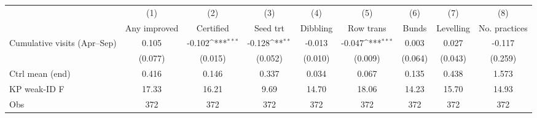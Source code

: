 {
\def\sym#1{\ifmmode^{#1}\else\(^{#1}\)\fi}
\begin{tabular}{l*{8}{c}}
\toprule
                    &\multicolumn{1}{c}{(1)}&\multicolumn{1}{c}{(2)}&\multicolumn{1}{c}{(3)}&\multicolumn{1}{c}{(4)}&\multicolumn{1}{c}{(5)}&\multicolumn{1}{c}{(6)}&\multicolumn{1}{c}{(7)}&\multicolumn{1}{c}{(8)}\\
                    &\multicolumn{1}{c}{Any improved}&\multicolumn{1}{c}{Certified}&\multicolumn{1}{c}{Seed trt}&\multicolumn{1}{c}{Dibbling}&\multicolumn{1}{c}{Row trans}&\multicolumn{1}{c}{Bunds}&\multicolumn{1}{c}{Levelling}&\multicolumn{1}{c}{No. practices}\\
\midrule
Cumulative visits (Apr--Sep)&       0.105         &      -0.102\sym{***}&      -0.128\sym{**} &      -0.013         &      -0.047\sym{***}&       0.003         &       0.027         &      -0.117         \\
                    &     (0.077)         &     (0.015)         &     (0.052)         &     (0.010)         &     (0.009)         &     (0.064)         &     (0.043)         &     (0.259)         \\
\midrule
Ctrl mean (end)     &       0.416         &       0.146         &       0.337         &       0.034         &       0.067         &       0.135         &       0.438         &       1.573         \\
KP weak-ID F        &       17.33         &       16.21         &        9.69         &       14.70         &       18.06         &       14.23         &       15.70         &       14.93         \\
Obs                 &         372         &         372         &         372         &         372         &         372         &         372         &         372         &         372         \\
\bottomrule
\end{tabular}
}
